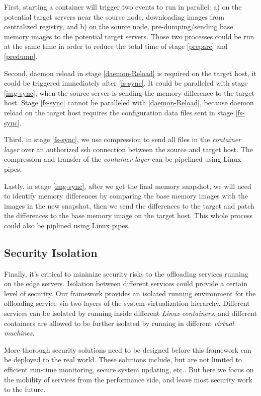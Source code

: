 
First, starting a container will trigger two events to run in parallel: a) on the potential target servers near the source node, downloading  images from centralized registry, and b) on the source node, pre-dumping/sending base memory images to the potential target servers. Those two processes could be run at the same time in order to reduce the total time of stage \ref{prepare} and \ref{predump}. 

Second, daemon reload in stage \ref{daemon-Reload} is required on the target host, it could be triggered immediately after \ref{fs-sync}. It could be paralleled with stage \ref{img-sync}, when the source server is sending the memory difference to the target host. Stage \ref{fs-sync} cannot be paralleled with \ref{daemon-Reload}, because daemon reload on the target host requires the configuration data files sent in stage \ref{fs-sync}.

Third,
in stage \ref{fs-sync}, we use compression to send all files in the \textit{container layer} over an authorized ssh connection between the source and target host. The compression and transfer of the \textit{container layer} can be pipelined using Linux pipes.

Lastly, in stage \ref{img-sync}, after we get the final memory snapshot, we will need to identify memory differences by comparing the base memory images with the images in the new snapshot, then we send the differences to the target and patch the differences to the base memory image on the target host. This whole process could also be piplined using Linux pipes. 



\subsection{Security Isolation}

Finally, it's critical to minimize security risks to the offloading services running on the edge servers. Isolation between different services could provide a certain level of security. Our framework provides an isolated running environment for the offloading service via two layers of the system virtualization hierarchy. Different services can be isolated by running inside different \textit{Linux containers}, and different containers are allowed to be further isolated by running in different  \textit{virtual machines}. 

More thorough security solutions need to be designed before this framework can be deployed to the real world. These solutions include, but are not limited to efficient run-time monitoring, secure system updating, etc.. But here we focus on the mobility of services from the performance side, and leave most security work to the future.



